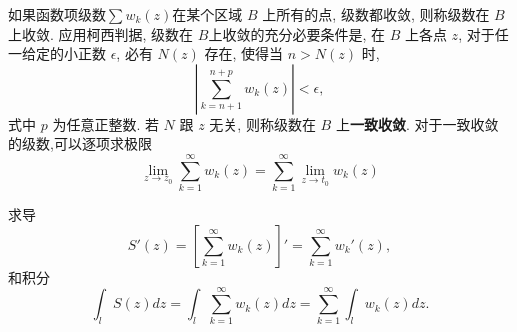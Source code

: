 如果函数项级数$\sum w_k(z)$在某个区域 $B$ 上所有的点, 级数都收敛, 
则称级数在 $B$ 上收敛. 应用柯西判据, 级数在 $B$上收敛的充分必要条件是, 
在 $B$ 上各点 $z$, 对于任一给定的小正数 $\epsilon$, 必有 $N(z)$ 存在, 
使得当 $n>N(z)$ 时,
$$
\left|\sum_{k=n+1}^{n+p} w_k(z)\right|<\epsilon,
$$
式中 $p$ 为任意正整数. 若 $N$ 跟 $z$ 无关, 则称级数在 $B$ 上\textbf{一致收敛}.
对于一致收敛的级数,可以逐项求极限
$$
\lim _{z \rightarrow z_0} \sum_{k=1}^{\infty} w_k(z)=\sum_{k=1}^{\infty} \lim _{z \rightarrow t_0} w_k(z)
$$

求导
$$
S' (z) = [ \sum_{k=1}^{\infty} w_k(z)]' =\sum_{k=1}^{\infty}  w_k'(z),
$$
和积分
$$
\int_l S(z) dz = \int_l \sum_{k=1}^{\infty} w_k(z) dz=\sum_{k=1}^{\infty} \int_l w_k(z) dz .
$$
